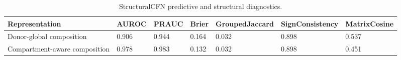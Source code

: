 \begin{table}
\caption{StructuralCFN predictive and structural diagnostics.}
\begin{tabular}{lllllll}
\toprule
Representation & AUROC & PRAUC & Brier & GroupedJaccard & SignConsistency & MatrixCosine \\
\midrule
Donor-global composition & 0.906 & 0.944 & 0.164 & 0.032 & 0.898 & 0.537 \\
Compartment-aware composition & 0.978 & 0.983 & 0.132 & 0.032 & 0.898 & 0.451 \\
\bottomrule
\end{tabular}
\end{table}
